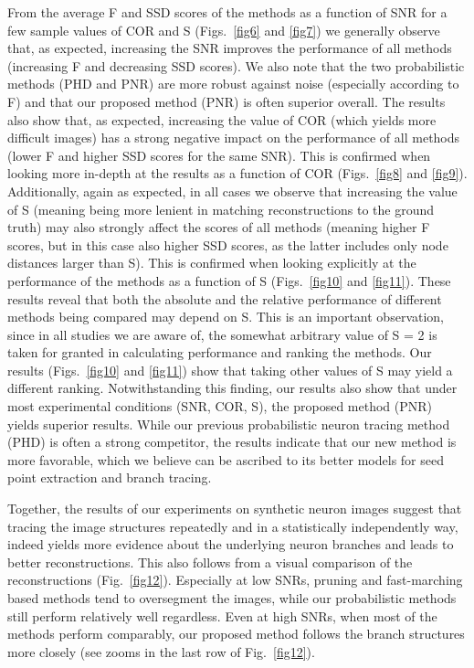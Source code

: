 From the average F and SSD scores of the methods as a function of SNR for a few sample values of COR and S (Figs.~\ref{fig6} and \ref{fig7}) we generally observe that, as expected, increasing the SNR improves the performance of all methods (increasing F and decreasing SSD scores). We also note that the two probabilistic methods (PHD and PNR) are more robust against noise (especially according to F) and that our proposed method (PNR) is often superior overall. The results also show that, as expected, increasing the value of COR (which yields more difficult images) has a strong negative impact on the performance of all methods (lower F and higher SSD scores for the same SNR). This is confirmed when looking more in-depth at the results as a function of COR (Figs.~\ref{fig8} and \ref{fig9}). Additionally, again as expected, in all cases we observe that increasing the value of S (meaning being more lenient in matching reconstructions to the ground truth) may also strongly affect the scores of all methods (meaning higher F scores, but in this case also higher SSD scores, as the latter includes only node distances larger than S). This is confirmed when looking explicitly at the performance of the methods as a function of S (Figs.~\ref{fig10} and \ref{fig11}). These results reveal that both the absolute and the relative performance of different methods being compared may depend on S. This is an important observation, since in all studies we are aware of, the somewhat arbitrary value of S = 2 is taken for granted in calculating performance and ranking the methods. Our results (Figs.~\ref{fig10} and \ref{fig11}) show that taking other values of S may yield a different ranking. Notwithstanding this finding, our results also show that under most experimental conditions (SNR, COR, S), the proposed method (PNR) yields superior results. While our previous probabilistic neuron tracing method (PHD) \cite{radojevic2017automated} is often a strong competitor, the results indicate that our new method is more favorable, which we believe can be ascribed to its better models for seed point extraction and branch tracing.

Together, the results of our experiments on synthetic neuron images suggest that tracing the image structures repeatedly and in a statistically independently way, indeed yields more evidence about the underlying neuron branches and leads to better reconstructions. This also follows from a visual comparison of the reconstructions (Fig.~\ref{fig12}). Especially at low SNRs, pruning and fast-marching based methods tend to oversegment the images, while our probabilistic methods still perform relatively well regardless. Even at high SNRs, when most of the methods perform comparably, our proposed method follows the branch structures more closely (see zooms in the last row of Fig.~\ref{fig12}).
